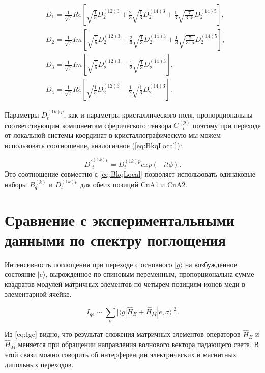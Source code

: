 \begin{equation}
	\label{eq:DLabels}
	\begin{aligned}
		& D_1 = \frac{1}{\sqrt{7}} Re \left[ \sqrt{\frac{1}{5}} D_2^{(12)3} + \frac{2}{3} \sqrt{\frac{1}{3}} D_2^{(14)3} + \frac{1}{3} \sqrt{\frac{7}{3 \cdot 5}} D_2^{(14)5} \right], \\
		& D_2 = \frac{1}{\sqrt{7}} Im \left[ \sqrt{\frac{1}{5}} D_2^{(12)3} + \frac{2}{3} \sqrt{\frac{1}{3}} D_2^{(14)3} + \frac{1}{3} \sqrt{\frac{7}{3 \cdot 5}} D_2^{(14)5} \right], \\
		& D_3 = \frac{1}{\sqrt{7}} Im \left[ \sqrt{\frac{1}{5}} D_2^{(12)3} - \frac{1}{2} \sqrt{\frac{1}{3}} D_2^{(14)3} \right], \\
		& D_4 = \frac{1}{\sqrt{7}} Re \left[ \sqrt{\frac{1}{5}} D_2^{(12)3} - \frac{1}{2} \sqrt{\frac{1}{3}} D_2^{(14)3} \right].
	\end{aligned}
\end{equation}

Параметры $D_t^{(1k)p}$, как и параметры кристаллического поля, пропорциональны соответствующим компонентам сферического тензора $C_{-t}^{(p)}$ поэтому при переходе от локальной системы координат в кристаллографическую мы можем использовать соотношение, аналогичное (\ref{eq:BkqLocal}):

\begin{equation}
	\label{eq:DkptLocal}
	{D^\prime}_t^{(1k)p} = D_t^{(1k)p} exp(-it\phi).
\end{equation}
Это соотношение совместно с \cref{eq:BkqLocal} позволяет использовать одинаковые наборы $B_q^{(k)}$ и $D_t^{(1k)p}$ для обеих позиций CuA1 и CuA2.

\section{Сравнение с экспериментальными данными по спектру поглощения}\label{sec:ch3/sect3}

Интенсивность поглощения при переходе с основного $| g \rangle$ на возбужденное состояние $| e \rangle$, вырожденное по спиновым переменным, пропорциональна сумме квадратов модулей матричных элементов по четырем позициям ионов меди в элементарной ячейке.

\begin{equation}
	\label{eq:Ige}
	I_{ge} \sim \sum_\sigma \lvert \langle g | \hat{H}_E + \hat{H}_M | e, \sigma \rangle \rvert^2.
\end{equation}

Из \cref{eq:Ige} видно, что результат сложения матричных элементов операторов $\hat{H}_E$ и $\hat{H}_M$ меняется при обращении направления волнового вектора падающего света. В этой связи можно говорить об интерференции электрических и магнитных дипольных переходов.

